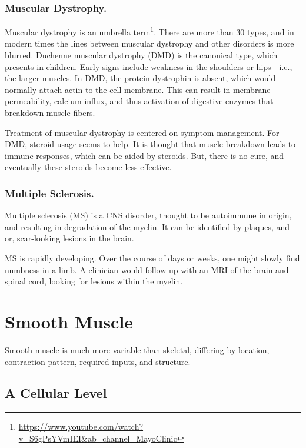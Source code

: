 \documentclass[12pt]{report}
\begin{document}
\subsubsection{Muscular Dystrophy.}

Muscular dystrophy is an umbrella term\footnote{\url{https://www.youtube.com/watch?v=S6gPsYVmIEI\&ab_channel=MayoClinic}}. There are more than 30 types, and in modern times the lines between muscular dystrophy and other disorders is more blurred. Duchenne muscular dystrophy (DMD) is the canonical type, which presents in children. Early signs include weakness in the shoulders or hips---i.e., the larger muscles. In DMD, the protein dystrophin is absent, which would normally attach actin to the cell membrane. This can result in membrane permeability, calcium influx, and thus activation of digestive enzymes that breakdown muscle fibers.\newline

Treatment of muscular dystrophy is centered on symptom management. For DMD, steroid usage seems to help. It is thought that muscle breakdown leads to immune responses, which can be aided by steroids. But, there is no cure, and eventually these steroids become less effective. 

\subsubsection{Multiple Sclerosis.}

Multiple sclerosis (MS) is a CNS disorder, thought to be autoimmune in origin, and resulting in degradation of the myelin. It can be identified by plaques, and or, scar-looking lesions in the brain.\newline

MS is rapidly developing. Over the course of days or weeks, one might slowly find numbness in a limb. A clinician would follow-up with an MRI of the brain and spinal cord, looking for lesions within the myelin. 


\section{Smooth Muscle}

Smooth muscle is much more variable than skeletal, differing by location, contraction pattern, required inputs, and structure. 


\subsection{A Cellular Level}
\end{document}
